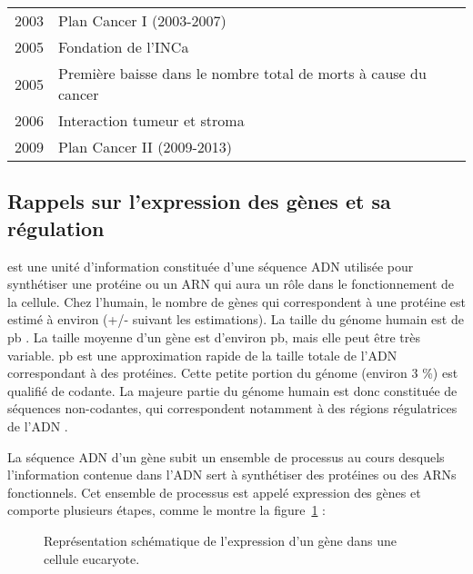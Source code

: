 \begin{table}
\begin{center}
\begin{tabular}{cl}
						2003          & Plan Cancer I (2003-2007)                                                               \\
						2005          & Fondation de l'\ac{INCa}                                                                \\
						2005          & Première baisse dans le nombre total de morts à cause du cancer                         \\
						2006          & Interaction tumeur et stroma                                                            \\
						2009          & Plan Cancer II (2009-2013)                                                              \\
						\bottomrule
					\end{tabular}
					\label{tab:Devita2012}
				\end{center}
			\end{table}

		\subsection{\textcolor{myred}{Rappels sur l'expression des gènes et sa régulation}}\label{sub:RappelsExpression}
			 est une unité d'information constituée d'une séquence \acs{ADN} utilisée pour synthétiser une protéine ou un \acs{ARN} qui aura un rôle dans le fonctionnement de la cellule.
			Chez l'humain, le nombre de gènes qui correspondent à une protéine est estimé à environ  \citep{HGP2001} (+/-  suivant les estimations).
			La taille du génome humain est de  \ac{pb} \citep{HGP2001}.
			La taille moyenne d'un gène est d'environ  \ac{pb}, mais elle peut être très variable.
			 \ac{pb} est une approximation rapide de la taille totale de l'\acs{ADN} correspondant à des protéines.
			Cette petite portion du génome (environ 3 \%) est qualifié de codante.
			La majeure partie du génome humain est donc constituée de séquences non-codantes, qui correspondent notamment à des régions régulatrices de l'ADN \citep{ENCODE2012}.

			La séquence \acs{ADN} d'un gène subit un ensemble de processus au cours desquels l'information contenue dans l'\acs{ADN} sert à synthétiser des protéines ou des \acsp{ARN} fonctionnels.
			Cet ensemble de processus est appelé expression des gènes et comporte plusieurs étapes, comme le montre la figure~\ref{fig:Expression} :
			\begin{figure}
				\begin{center}
					\def\svgwidth{.8\columnwidth}
					\caption{Représentation schématique de l'expression d'un gène dans une cellule eucaryote.}
					\label{fig:Expression}
				\end{center}
			\end{figure}

